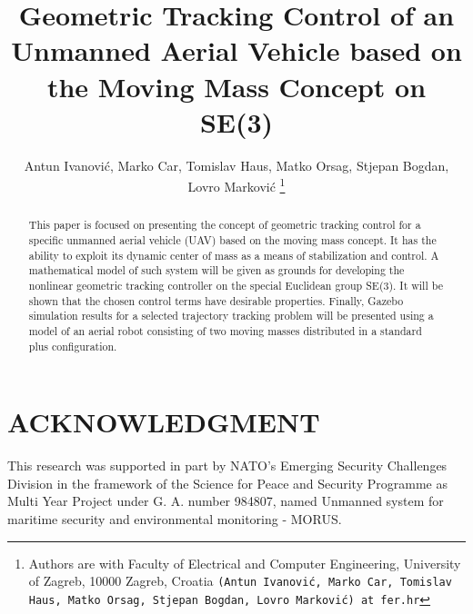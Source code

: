 \documentclass[letterpaper, 10 pt, conference]{ieeeconf}  %
\title{\LARGE \bf
Geometric Tracking Control of an Unmanned Aerial Vehicle based on the Moving Mass Concept on SE(3)
}
\author{Antun Ivanović, Marko Car, Tomislav Haus, Matko Orsag, Stjepan Bogdan, Lovro Marković
	\thanks{Authors are with Faculty of Electrical and Computer Engineering,
        University of Zagreb, 10000 Zagreb, Croatia
        {\tt\small (Antun Ivanović, Marko Car, Tomislav Haus, Matko Orsag, Stjepan Bogdan, Lovro Marković) at fer.hr}}}%
\begin{document}
\maketitle

\thispagestyle{empty}
\pagestyle{empty}


\begin{abstract}

This paper is focused on presenting the concept of geometric tracking control for a specific unmanned aerial vehicle (UAV) based on the moving mass concept. It has the ability to exploit its dynamic center of mass as a means of stabilization and control. A mathematical model of such system will be given as grounds for developing the nonlinear geometric tracking controller on the special Euclidean group SE(3). It will be shown that the chosen control terms have desirable properties. Finally, Gazebo simulation results for a selected trajectory tracking problem will be presented using a model of an aerial robot consisting of two moving masses distributed in a standard plus configuration.

\end{abstract}




%






\section*{ACKNOWLEDGMENT}

This research was supported in part by NATO's Emerging Security Challenges Division in the framework of the Science for Peace and Security Programme as Multi Year Project under G. A. number 984807, named Unmanned system for maritime security and environmental monitoring - MORUS.



\nocite{*}


\end{document}
